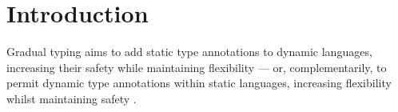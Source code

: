 \documentclass[sigplan,10pt,review,screen]{acmart}\settopmatter{printfolios=true}
\begin{document}

\maketitle


\section{Introduction}


Gradual typing aims to add static type annotations to dynamic languages, increasing
their safety while maintaining flexibility
\citep{GiladPluggable2004,Siek2006,XXXSiek2015}
--- or, complementarily,
to permit dynamic type annotations within static languages, increasing
flexibility whilst maintaining safety
\citep{AbadiTOPLAS1991}.
\end{document}
